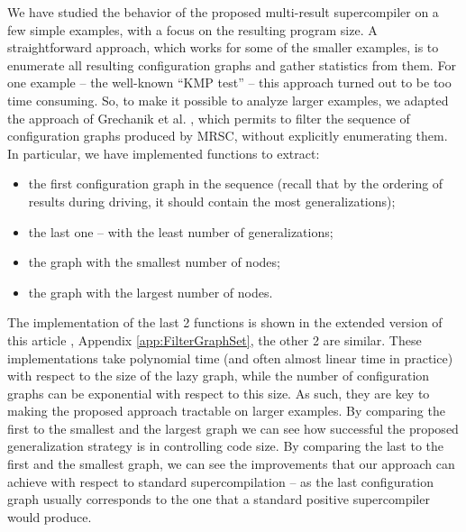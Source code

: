 \documentclass[submission,copyright,creativecommons]{eptcs}
\begin{document}
We have studied the behavior of the proposed multi-result supercompiler on a few simple
examples, with a focus on the resulting program size.
A straightforward approach, which works for some of the smaller examples,
is to enumerate all resulting configuration graphs and gather statistics from them.
For one example -- the well-known ``KMP test'' -- this approach turned out to be too
time consuming.
So, to make it possible to analyze larger examples, we adapted the approach 
of Grechanik et al. \cite{Romanenko2014StagedMRSC}, which permits to filter
the sequence of configuration graphs produced by MRSC, without explicitly
enumerating them.
In particular, we have implemented functions to extract:
\begin{itemize}
  \item the first configuration graph in the sequence (recall that by the ordering of 
    results during driving, it should contain the most generalizations);
  \item the last one -- with the least number of generalizations;
  \item the graph with the smallest number of nodes;
  \item the graph with the largest number of nodes.
\end{itemize}
The implementation of the last 2 functions is shown in
\ifVptVer
the extended version of this article \cite{krustev2020MrscOptSizeReport},
\else
Appendix \ref{app:FilterGraphSet},
\fi
the other 2 are similar.
These implementations take polynomial time (and often almost linear time in practice)  
with respect to the size of the lazy graph,
while the number of configuration graphs can be exponential with respect to this size.
As such, they are key to making the proposed approach tractable on larger examples.
By comparing the first to the smallest and the largest graph we can see how 
successful the proposed generalization strategy is in controlling code size.
By comparing the last to the first and the smallest graph, we can see the improvements
that our approach can achieve with respect to standard supercompilation --
as the last configuration graph usually corresponds to the one that a standard positive supercompiler would produce.
\end{document}
